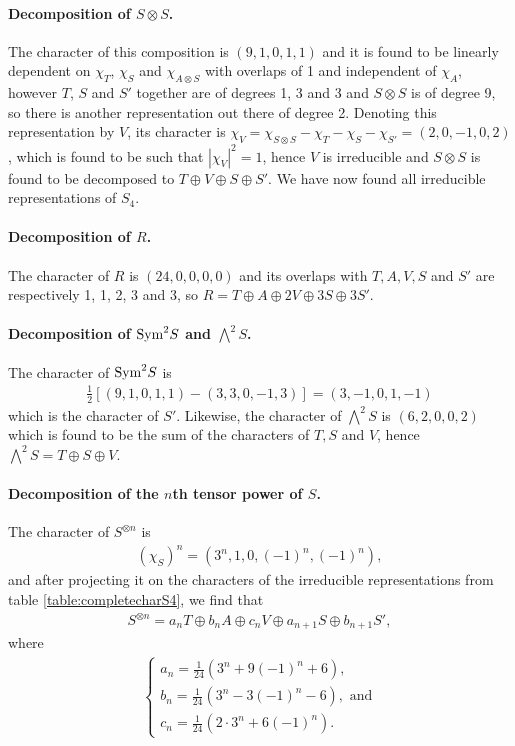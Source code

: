 \paragraph{Decomposition of $S \otimes S$.} The character of this composition is $(9,1,0,1,1)$ and it is found to be linearly dependent on $\chi_T$,  $\chi_S$ and $\chi_{A \otimes S}$ with overlaps of 1 and independent of $\chi_A$, however $T$, $S$ and $S'$ together are of degrees 1, 3 and 3 and $S \otimes S$ is of degree 9, so there is another representation out there of degree 2. Denoting this representation by $V$, its character is $\chi_V = \chi_{S \otimes S} - \chi_T - \chi_S - \chi_{S'} = (2, 0, -1, 0, 2)$, which is found to be such that $|\chi_V|^2 = 1$, hence $V$ is irreducible and $S \otimes S$ is found to be decomposed to $T \oplus V \oplus S \oplus S'$. We have now found all irreducible representations of $S_4$.

\paragraph{Decomposition of $R$.} The character of $R$ is $(24,0,0,0,0)$ and its overlaps with $T, A, V, S$ and $S'$ are respectively 1, 1, 2, 3 and 3, so $R = T \oplus A \oplus 2V \oplus 3S \oplus 3S'$.

\paragraph{Decomposition of $\text{Sym}^2S$ and $\bigwedge^2S$.} The character of $\text{Sym}^2S$ is 
\begin{align}
	\frac{1}{2}\left[ (9,1,0,1,1)-(3,3,0,-1,3) \right] = (3,-1,0,1,-1)
\end{align}
which is the character of $S'$. Likewise, the character of $\bigwedge^2S$ is $(6,2,0,0,2)$ which is found to be the sum of the characters of $T, S$ and $V$, hence $\bigwedge^2S = T \oplus S \oplus V$.

\paragraph{Decomposition of the $n$th tensor power of $S$.} The character of $S^{\otimes n}$ is 
\begin{align}
	(\chi_S)^n = (3^n, 1, 0, (-1)^n, (-1)^n),
\end{align}
and after projecting it on the characters of the irreducible representations from table \ref{table:completecharS4}, we find that
\begin{align}\label{eq:nthpowerS}
	S^{\otimes n} = a_n T \oplus b_n A \oplus c_n V \oplus a_{n+1} S \oplus b_{n+1} S',
\end{align}
where 
\begin{align}
	\begin{cases}
		a_n = \frac{1}{24}(3^n + 9(-1)^n+6), \\
		b_n = \frac{1}{24}(3^n - 3(-1)^n -6), \text{ and} \\
		c_n = \frac{1}{24}(2\cdot 3^n + 6(-1)^n).
	\end{cases}
\end{align}

